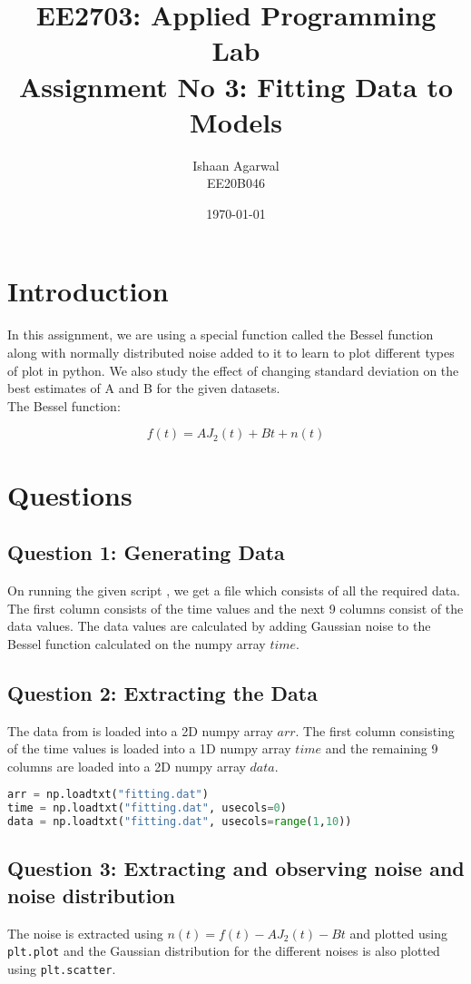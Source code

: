\documentclass[11pt, a4paper]{article}
\title{EE2703: Applied Programming Lab \\ Assignment No 3: Fitting Data to Models} %
\author{Ishaan Agarwal \\ EE20B046} %
\date{\today} %
\begin{document}
		
		
\maketitle %

\section{Introduction}
In this assignment, we are using a special function called the Bessel function along with normally distributed noise added to it to learn to plot different types of plot in python. We also study the effect of changing standard deviation on the best estimates of A and B for the given datasets. \\ The Bessel function:

\[f(t) = AJ_2(t) + Bt + n(t)\]

\section{Questions}
\subsection{Question 1: Generating Data}
On running the given script , we get a file  which consists of all the required data. The first column consists of the time values and the next 9 columns consist of the data values. The data values are calculated by adding Gaussian noise to the Bessel function calculated on the numpy array $time$.


\subsection{Question 2: Extracting the Data}
The data from  is loaded into a 2D numpy array $arr$. The first column consisting of the time values is loaded into a 1D numpy array $time$ and the remaining 9 columns are loaded into a 2D numpy array $data$. \\

\begin{lstlisting}[language = Python]
arr = np.loadtxt("fitting.dat")
time = np.loadtxt("fitting.dat", usecols=0)
data = np.loadtxt("fitting.dat", usecols=range(1,10))
\end{lstlisting}


\subsection{Question 3: Extracting and observing noise and noise distribution}
The noise is extracted using $n(t) = f(t) - AJ_2(t)-Bt$ and plotted using \texttt{plt.plot} and the Gaussian distribution for the different noises is also plotted using \texttt{plt.scatter}.\\
\end{document}
